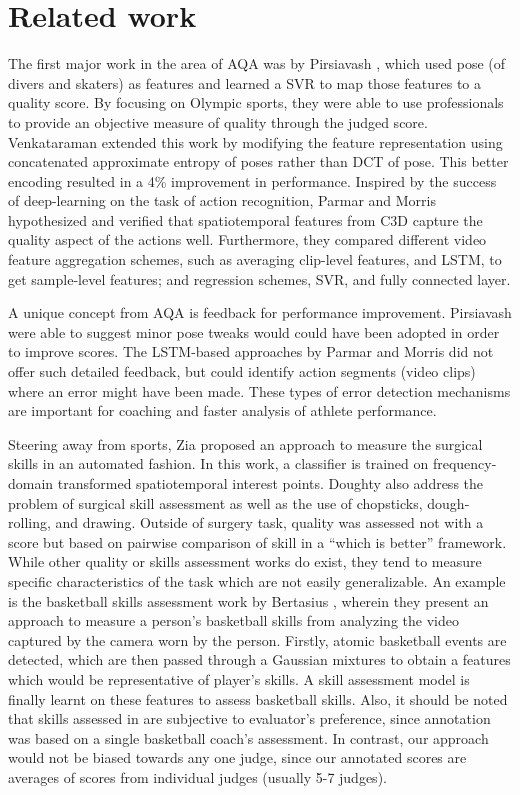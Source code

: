 \documentclass[10pt,twocolumn,letterpaper]{article}
\begin{document}
\section{Related work}
\label{sec:related}
The first major work in the area of AQA was by Pirsiavash \etal \cite{pirsia}, which used pose (of divers and skaters) as features and learned a SVR to map those features to a quality score. By focusing on Olympic sports, they were able to use professionals to provide an objective measure of quality through the judged score. Venkataraman \etal \cite{venkat} extended this work by modifying the feature representation using concatenated approximate entropy of poses rather than DCT of pose.  This better encoding resulted in a 4\% improvement in performance.  Inspired by the success of deep-learning on the task of action recognition, Parmar and Morris \cite{parmar} hypothesized and verified that spatiotemporal features from C3D\cite{c3d} capture the quality aspect of the actions well.  Furthermore, they compared different video feature aggregation schemes, such as averaging clip-level features, and LSTM, to get sample-level features; and regression schemes, SVR, and fully connected layer. 

A unique concept from AQA is feedback for performance improvement.  Pirsiavash \etal \cite{pirsia} were able to suggest minor pose tweaks would could have been adopted in order to improve scores.  The LSTM-based approaches by Parmar and Morris \cite{parmar} did not offer such detailed feedback, but could identify action segments (video clips) where an error might have been made.  These types of error detection mechanisms are important for coaching and faster analysis of athlete performance.  

Steering away from sports, Zia \etal \cite{zia} proposed an approach to measure the surgical skills in an automated fashion. In this work, a classifier is trained on frequency-domain transformed spatiotemporal interest points.  Doughty \etal \cite{doughty} also address the problem of surgical skill assessment as well as the use of chopsticks, dough-rolling, and drawing.  Outside of surgery task, quality was assessed not with a score but based on pairwise comparison of skill in a ``which is better'' framework.  While other quality or skills assessment works do exist, they tend to measure specific characteristics of the task which are not easily generalizable. An example is the basketball skills assessment work by Bertasius \etal \cite{baller}, wherein they present an approach to measure a person's basketball skills from analyzing the video captured by the camera worn by the person. Firstly, atomic basketball events are detected, which are then passed through a Gaussian mixtures to obtain a features which would be representative of player's skills. A skill assessment model is finally learnt on these features to assess basketball skills. Also, it should be noted that skills assessed in \cite{baller} are subjective to evaluator's preference, since annotation was based on a single basketball coach's assessment. In contrast, our approach would not be biased towards any one judge, since our annotated scores are averages of scores from individual judges (usually 5-7 judges).
\end{document}
